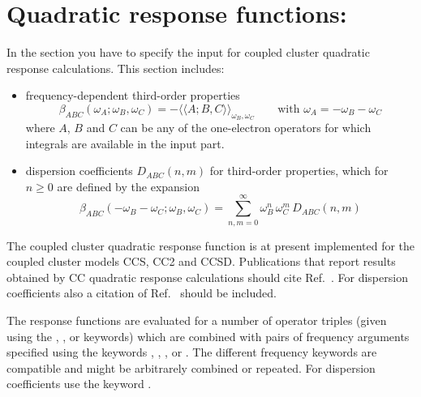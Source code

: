 
\section{Quadratic response functions: }
\label{sec:ccqr}

In the  section you have to specify the input for
coupled cluster quadratic response calculations. This section
includes:
\begin{itemize}
\item frequency-dependent third-order properties 
      $$\beta_{ABC}(\omega_A;\omega_B,\omega_C) = -
        \langle\langle A; B, C\rangle\rangle_{\omega_B,\omega_C} 
        \qquad \mbox{with~} \omega_A = -\omega_B - \omega_C
       $$
      where $A$, $B$ and $C$ can be any of the one-electron operators
      for which integrals are available in the  
      input part.
\item dispersion coefficients $D_{ABC}(n,m)$ for third-order properties,
      which for $n\ge 0$ are defined by the expansion
      $$ \beta_{ABC}(-\omega_B-\omega_C;\omega_B,\omega_C)  = 
        \sum_{n,m=0}^{\infty} \omega_{B}^n \, \omega_{C}^m \, D_{ABC}(n,m) 
      $$
\end{itemize}
The coupled cluster quadratic response function is at present
implemented for the coupled cluster models CCS, CC2 and CCSD.
Publications that report results obtained by CC quadratic response
calculations should cite Ref.\ \cite{Haettig:CCQR}.
For dispersion coefficients also a citation of 
Ref.\ \cite{Haettig:DISPBETA} should be included.

The response functions are evaluated for a number of 
operator triples (given using the
, , or  keywords) 
which are combined with pairs of frequency arguments specified using the 
keywords , , , 
or . The different frequency keywords are 
compatible and might be arbitrarely combined or repeated.
For dispersion coefficients use the keyword .

